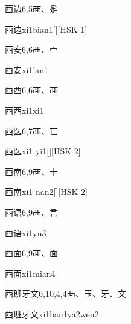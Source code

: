 \begin{entry}{西边}{6,5}{⾑、⾡}
  \begin{phonetics}{西边}{xi1bian1}[][HSK 1]
  \end{phonetics}
\end{entry}

\begin{entry}{西安}{6,6}{⾑、⼧}
  \begin{phonetics}{西安}{xi1'an1}
  \end{phonetics}
\end{entry}

\begin{entry}{西西}{6,6}{⾑、⾑}
  \begin{phonetics}{西西}{xi1xi1}
  \end{phonetics}
\end{entry}

\begin{entry}{西医}{6,7}{⾑、⼖}
  \begin{phonetics}{西医}{xi1 yi1}[][HSK 2]
  \end{phonetics}
\end{entry}

\begin{entry}{西南}{6,9}{⾑、⼗}
  \begin{phonetics}{西南}{xi1 nan2}[][HSK 2]
  \end{phonetics}
\end{entry}

\begin{entry}{西语}{6,9}{⾑、⾔}
  \begin{phonetics}{西语}{xi1yu3}
  \end{phonetics}
\end{entry}

\begin{entry}{西面}{6,9}{⾑、⾯}
  \begin{phonetics}{西面}{xi1mian4}
  \end{phonetics}
\end{entry}

\begin{entry}{西班牙文}{6,10,4,4}{⾑、⽟、⽛、⽂}
  \begin{phonetics}{西班牙文}{xi1ban1ya2wen2}
  \end{phonetics}
\end{entry}

